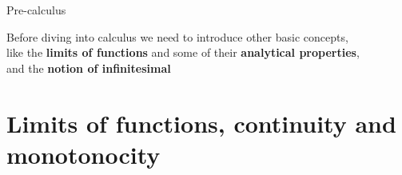 \documentclass[9pt]{beamer}
\begin{document}
\begin{frame}{Pre-calculus}

    \centering
    Before diving into calculus we need to introduce other basic concepts, \\
    like the \textbf{limits of functions} and some of their \textbf{analytical properties}, \\ and the \textbf{notion of infinitesimal}
    
\end{frame}

\section{Limits of functions, continuity and monotonocity}
\end{document}
